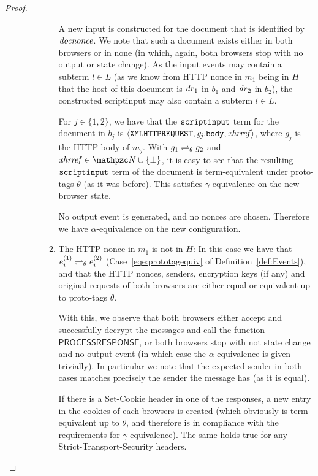 \begin{theorem}
\begin{proof}
\begin{description}
\begin{enumerate}[I.]
\begin{enumerate}
              A new input is constructed for the document that is identified
              by $\mathit{docnonce}$. We note that such a document exists either
              in both browsers or in none (in which, again, both browsers
              stop with no output or state change). As the input events may
              contain a subterm $l \in L$ (as we know from HTTP nonce in
              $m_1$ being in $H$ that the host of this document is
              $\mathit{dr}_1$ in $b_1$ and $\mathit{dr}_2$ in $b_2$), the
              constructed scriptinput may also contain a subterm $l \in L$.
      
              For $j \in \{1,2\}$, we have that the $\mathtt{scriptinput}$ term
              for the document in $b_j$ is $\langle\mathtt{XMLHTTPREQUEST},
                \mathit{g_j}.\mathtt{body}, \mathit{xhrref}\rangle$, where $g_j$ is the HTTP
              body of $m_j$.  With $g_1 \rightleftharpoons_{\theta} g_2$ and
              $\mi{xhrref} \in \nonces \cup \{\bot\}$, it is easy to see
              that the resulting $\mathtt{scriptinput}$ term of the document is
              term-equivalent under proto-tags $\theta$ (as it was before).
              This satisfies $\gamma$-equivalence on the new browser state.
      
              No output event is generated, and no nonces are chosen.
              Therefore we have $\alpha$-equivalence on the new
              configuration.
      
            \item The HTTP nonce in $m_1$ is not in $H$: In this case we
              have that $e_i^{(1)} \rightleftharpoons_{\theta} e_i^{(2)}$
              (Case~\ref{eqe:prototagequiv} of
              Definition~\ref{def:Events}), and that the HTTP nonces,
              senders, encryption keys (if any) and original requests of both browsers are either equal or
              equivalent up to proto-tags $\theta$.

              With this, we observe that both browsers either accept and
              successfully decrypt the messages and call the function
              $\mathsf{PROCESSRESPONSE}$, or both browsers stop with not
              state change and no output event (in which case the
              $\alpha$-equivalence is given trivially). In particular we
              note that the expected sender in both cases matches precisely
              the sender the message has (as it is equal).
      
              If there is a Set-Cookie header in one of the responses, a new
              entry in the cookies of each browsers is created (which
              obviously is term-equivalent up to $\theta$, and therefore is
              in compliance with the requirements for $\gamma$-equivalence).
              The same holds true for any Strict-Transport-Security headers.
      

\end{enumerate}
\end{enumerate}
\end{description}
\end{proof}
\end{theorem}
